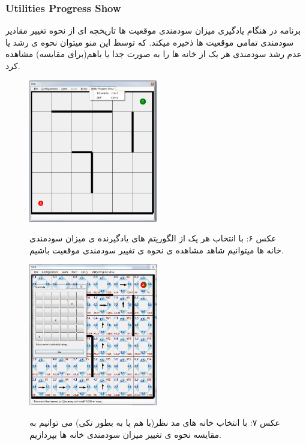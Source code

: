 \documentclass[10pt,a4paper]{article}
\begin{document}
\begin{Arabic}
    \subsubsection{Utilities Progress Show}
    برنامه در هنگام یادگیری میزان سودمندی موقعیت ها تاریخچه ای از نحوه تغییر مقادیر سودمندی تمامی موقعیت ها ذخیره میکند. که توسط این منو میتوان نحوه ی رشد یا عدم رشد سودمندی هر یک از خانه ها را به صورت جدا یا باهم(برای مقایسه) مشاهده کرد.
\begin{figure}[H]
    \centering
    \includegraphics[width=0.5\textwidth]{util-menu}
    \begin{center}
    \textarabic{عکس ۶: با انتخاب هر یک از الگوریتم های یادگیرنده ی میزان سودمندی خانه ها میتوانیم شاهد مشاهده ی نحوه ی تغییر سودمندی موقعیت باشیم.}
    \end{center}
\end{figure}\begin{figure}[H]
    \centering
    \includegraphics[width=0.5\textwidth]{util-form}
    \begin{center}
    \textarabic{عکس ۷: با انتخاب خانه های مد نظر(با هم یا به بطور تکی) می توانیم به مقایسه نحوه ی تغییر میزان سودمندی خانه ها بپردازیم.}
    \end{center}
\end{figure}
\end{Arabic}
\end{document}
